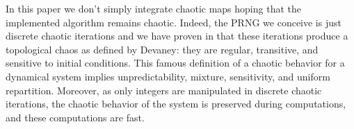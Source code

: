 In this paper we don't simply integrate chaotic maps hoping that the implemented algorithm remains chaotic. Indeed, the PRNG we conceive is just discrete chaotic iterations and we have proven in \cite{guyeux10} that these iterations produce a topological chaos as defined by Devaney: they are regular, transitive, and sensitive to initial conditions. This famous definition of a chaotic behavior for a dynamical system implies unpredictability, mixture, sensitivity, and uniform repartition. Moreover, as only integers are manipulated in discrete chaotic iterations, the chaotic behavior of the system is preserved during computations, and these computations are fast.

